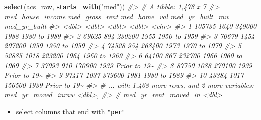 \documentclass[
]{book}
\newenvironment{Shaded}{\begin{snugshade}}{\end{snugshade}}
\newcommand{\CommentTok}[1]{\textcolor[rgb]{0.56,0.35,0.01}{\textit{#1}}}
\newcommand{\KeywordTok}[1]{\textcolor[rgb]{0.13,0.29,0.53}{\textbf{#1}}}
\newcommand{\NormalTok}[1]{#1}
\newcommand{\StringTok}[1]{\textcolor[rgb]{0.31,0.60,0.02}{#1}}
\providecommand{\tightlist}{%
  \setlength{\itemsep}{0pt}\setlength{\parskip}{0pt}}
\begin{document}
\begin{Shaded}
\begin{Highlighting}[]
\KeywordTok{select}\NormalTok{(acs\_raw, }\KeywordTok{starts\_with}\NormalTok{(}\StringTok{"med"}\NormalTok{))}
\CommentTok{\#\textgreater{} \# A tibble: 1,478 x 7}
\CommentTok{\#\textgreater{}    med\_house\_income med\_gross\_rent med\_home\_val med\_yr\_built\_raw med\_yr\_built}
\CommentTok{\#\textgreater{}               \textless{}dbl\textgreater{}          \textless{}dbl\textgreater{}        \textless{}dbl\textgreater{}            \textless{}dbl\textgreater{} \textless{}chr\textgreater{}       }
\CommentTok{\#\textgreater{}  1           105735           1640       349000             1988 1980 to 1989}
\CommentTok{\#\textgreater{}  2            69625            894       230200             1955 1950 to 1959}
\CommentTok{\#\textgreater{}  3            70679           1454       207200             1959 1950 to 1959}
\CommentTok{\#\textgreater{}  4            74528            954       268400             1973 1970 to 1979}
\CommentTok{\#\textgreater{}  5            52885           1018       223200             1964 1960 to 1969}
\CommentTok{\#\textgreater{}  6            64100            867       232700             1966 1960 to 1969}
\CommentTok{\#\textgreater{}  7            37093            910       170900             1939 Prior to 19\textasciitilde{}}
\CommentTok{\#\textgreater{}  8            87750           1088       270100             1939 Prior to 19\textasciitilde{}}
\CommentTok{\#\textgreater{}  9            97417           1037       379600             1981 1980 to 1989}
\CommentTok{\#\textgreater{} 10            43384           1017       156500             1939 Prior to 19\textasciitilde{}}
\CommentTok{\#\textgreater{} \# ... with 1,468 more rows, and 2 more variables: med\_yr\_moved\_inraw \textless{}dbl\textgreater{},}
\CommentTok{\#\textgreater{} \#   med\_yr\_rent\_moved\_in \textless{}dbl\textgreater{}}
\end{Highlighting}
\end{Shaded}

\begin{itemize}
\tightlist
\item
  select columns that end with \texttt{"per"}
\end{itemize}
\end{document}
